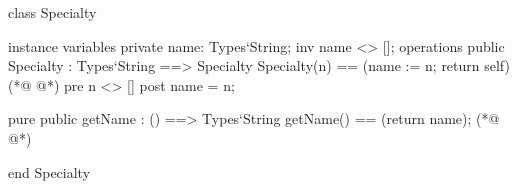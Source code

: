 \begin{vdmpp}[breaklines=true]
class Specialty

instance variables
  private name: Types`String;
  inv name <> [];
operations
 public Specialty : Types`String ==> Specialty
  Specialty(n) == (name := n; return self)
(*@
\label{Specialty:9}
@*)
 pre n <> []
 post name = n;
  
 pure public getName : () ==> Types`String
  getName() == (return name);
(*@
\label{getName:14}
@*)

end Specialty
\end{vdmpp}
